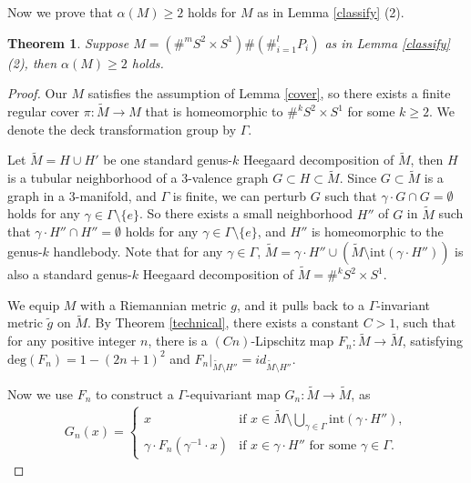 \documentclass{amsart}
\newtheorem{thm}{Theorem}[section]
\begin{document}
Now we prove that $\alpha(M)\geq 2$ holds for $M$ as in Lemma \ref{classify} (2).

\begin{thm}\label{sphericalsummand}
Suppose $M=(\#^m S^2\times S^1)\#(\#_{i=1}^l P_i)$ as in Lemma \ref{classify} (2), then $\alpha(M)\geq 2$ holds.
\end{thm}

\begin{proof}
Our $M$ satisfies the assumption of Lemma \ref{cover}, so there exists a finite regular cover $\pi:\tilde{M}\to M$ that is homeomorphic to $\#^kS^2\times S^1$ for some $k\geq 2$. We denote the deck transformation group by $\Gamma$. 

Let $\tilde{M}=H\cup H'$ be one standard genus-$k$ Heegaard decomposition of $\tilde{M}$, then $H$ is a tubular neighborhood of a $3$-valence graph $G\subset H \subset \tilde{M}$. Since $G\subset \tilde{M}$ is a graph in a $3$-manifold, and $\Gamma$ is finite, we can perturb $G$ such that $\gamma\cdot G\cap G=\emptyset$ holds for any $\gamma\in \Gamma\setminus \{e\}$.  So there exists a small neighborhood $H''$ of $G$ in $\tilde{M}$ such that $\gamma\cdot H''\cap H''=\emptyset$ holds for any $\gamma\in \Gamma\setminus \{e\}$, and $H''$ is homeomorphic to the genus-$k$ handlebody. Note that for any $\gamma\in \Gamma$, $\tilde{M}=\gamma\cdot H''\cup (\tilde{M}\setminus \text{int}(\gamma \cdot H''))$ is also a standard genus-$k$ Heegaard decomposition of $\tilde{M}=\#^kS^2\times S^1$.



We equip $M$ with a Riemannian metric $g$, and it pulls back to a $\Gamma$-invariant metric $\tilde{g}$ on $\tilde{M}$.
By Theorem \ref{technical}, there exists a constant $C>1$, such that for any positive integer $n$, there is a $(Cn)$-Lipschitz map $F_n:\tilde{M}\to \tilde{M}$, satisfying $\text{deg}(F_n)=1-(2n+1)^2$ and $F_n|_{\tilde{M}\setminus H''}=id_{\tilde{M}\setminus H''}$.

Now we use $F_n$ to construct a $\Gamma$-equivariant map $G_n:\tilde{M}\to \tilde{M}$, as 
\begin{equation*}
\begin{aligned}
G_n(x)=\begin{cases}
x & \text{if\ } x\in \tilde{M}\setminus \bigcup_{\gamma\in \Gamma}\text{int}(\gamma \cdot H''),\\
\gamma \cdot F_n(\gamma^{-1}\cdot x) & \text{if\ } x\in \gamma \cdot H'' \text{\ for\ some\ }\gamma\in \Gamma. 
\end{cases}
\end{aligned}
\end{equation*}




\end{proof}
\end{document}
